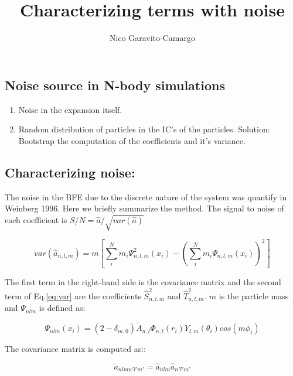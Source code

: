 \documentclass[14pt]{article}
\title{Characterizing terms with noise}
\author{Nico Garavito-Camargo}
\date{}
\begin{document}
\maketitle

\section*{}

\subsection{Noise source in N-body simulations}

\begin{enumerate}
  \item Noise in the expansion itself.
  \item Random distribution of particles in the IC's of the particles. Solution:
    Bootstrap the computation of the coefficients and it's variance.
\end{enumerate}

\subsection{Characterizing noise:}

The noise in the BFE due to the discrete nature of the system was quantify in
Weinberg 1996. Here we briefly summarize the method.
The signal to noise of each coefficient is $S/N=\hat{a}/\sqrt{var({\hat{a}})}$

\begin{equation}\label{eq:var}
  var(\hat{a}_{n,l,m}) = m \left[ \sum_{i}^{N}m_i \Psi_{n,l,m}^2(x_i)
   - \left(\sum_{i}^{N}m_i \Psi_{n,l,m}(x_i)\right)^2
   \right]
\end{equation}

The first term in the right-hand side is the covariance matrix and
the second term of Eq.\ref{eq:var} are the coefficients
$\hat{S}_{n,l,m}^2$ and $\hat{T}_{n,l,m}^2$. $m$ is the particle
mass and $\Psi_{nlm}$ is defined as:

\begin{equation}
  \Psi_{nlm}(x_i) = (2-\delta_{m,0})
  \tilde{A}_{n,l}\Phi_{n,l}(r_i)Y_{l,m}(\theta_i)cos(m\phi_i)
\end{equation}

The covariance matrix is computed as::

\begin{equation}
  \tilde{a}_{nlm n'l'm'} = \hat{a}_{nlm} \hat{a}_{n'l'm'}
\end{equation}
\end{document}
